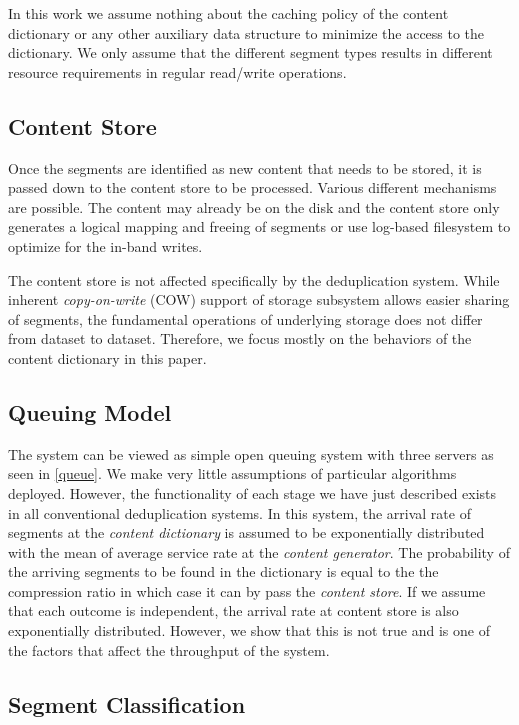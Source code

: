 In this work we assume nothing about the caching policy of the content dictionary or any other auxiliary data structure to minimize the access to the dictionary. We only assume that the different segment types results in different resource requirements in regular read/write operations. 

\subsection{Content Store}

Once the segments are identified as new content that needs to be stored, it is passed down to the content store to be processed. Various different mechanisms are possible. The content may already be on the disk and the content store only generates a logical mapping and freeing of segments\cite{clements2009decentralized, Rhea:2008:FIC:1404014.1404025} or use log-based filesystem to optimize for the in-band writes\cite{Zhu:2008:ADB:1364813.1364831}.

The content store is not affected specifically by the deduplication system. While inherent \emph{copy-on-write} (COW) support of storage subsystem\cite{bonwick2003zettabyte, dillon2008hammer} allows easier sharing of segments, the fundamental operations of underlying storage does not differ from dataset to dataset. Therefore, we focus mostly on the behaviors of the content dictionary in this paper. 

\subsection{Queuing Model}
The system can be viewed as simple open queuing system with three servers as seen in \figurename \ref{queue}. We make very little assumptions of particular algorithms deployed. However, the functionality of each stage we have just described exists in all conventional deduplication systems. 
In this system, the arrival rate of segments at the \emph{content dictionary} is assumed to be exponentially distributed with the mean of average service rate at the \emph{content generator}. The probability of the arriving segments to be found in the dictionary is equal to the the compression ratio in which case it can by pass the \emph{content store}. If we assume that each outcome is independent, the arrival rate at content store is also exponentially distributed. However, we show that this is not true and is one of the factors that affect the throughput of the system.  

\subsection{Segment Classification}

